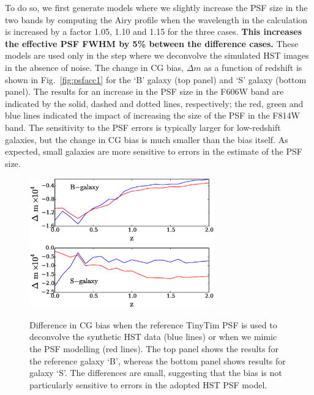 \documentclass[useAMS,usenatbib]{mnras}
\begin{document}
To do so, we first generate models where we slightly increase the PSF size in the two bands by computing the  Airy profile when the wavelength in the calculation is increased by a factor 1.05, 1.10 and 1.15 for the three cases. {\bf This increases the effective PSF FWHM by 5\% between the difference cases.} These models are used only in the step where we deconvolve the simulated HST images in the absence of noise. The change in CG bias, $\Delta m$ as a function of redshift is shown in Fig.~\ref{fig:psfacc1} for the `B' galaxy (top panel) and `S' galaxy (bottom panel).  The results for an increase in the PSF size in  the F606W band are indicated by the solid, dashed and dotted lines, respectively; the red, green and blue lines indicated the impact of increasing the size of the PSF in the F814W band. The sensitivity to the PSF errors is typically larger for low-redshift galaxies, but the change in CG bias is much smaller than the bias itself.  As expected, small galaxies are more sensitive to errors in the estimate of the PSF size.

\begin{figure}
\includegraphics[width=8.0cm]{ztinytim_b.eps}
\includegraphics[width=8.0cm]{ztinytim_s.eps}
\caption{Difference in CG bias when the reference {\sc TinyTim} PSF is used to deconvolve
the synthetic HST data (blue lines) or when we mimic the PSF modelling (red lines). The top
panel shows the results for the reference galaxy `B', whereas the bottom panel shows results
for galaxy `S'. The differences are small, suggesting that the bias is not particularly sensitive to
errors in the adopted HST PSF model.}
\label{fig:psfacc2}
\end{figure}
\end{document}
